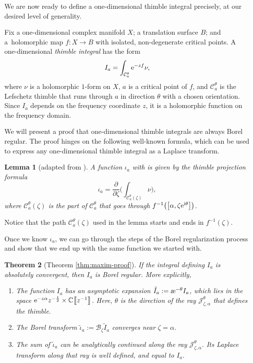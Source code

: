 \documentclass[10pt,a4paper]{amsart}
\newcommand{\maps}{\colon}
\newcommand{\C}{\mathbb{C}}
\newcommand{\series}[1]{\tilde{#1}}
\newcommand{\laplace}{\mathcal{L}}
\newcommand{\borel}{\mathcal{B}}
\newcommand{\aexp}{\text{\rm \ae}}
\numberwithin{equation}{section}
\newtheorem{Theorem}{Theorem}[section]
\newtheorem{Lemma}[Theorem]{Lemma}
\begin{document}
We are now ready to define a one-dimensional thimble integral precisely, at our desired level of generality.
\begin{Definition}
Fix a one-dimensional complex manifold $X$; a translation surface $B$; and a~holomorphic map $f \maps X \to B$ with isolated, non-degenerate critical points. A one-dimensional {\em thimble integral} has the form
\[
 I_a = \int_{\mathcal{C}_a^\theta} {\rm e}^{-zf} \nu,
 \]
where $\nu$ is a holomorphic $1$-form on $X$, $a$ is a critical point of $f$, and $\mathcal{C}^\theta_a$ is the Lefschetz thimble that runs through $a$ in direction $\theta$ with a chosen orientation. Since $I_a$ depends on the frequency coordinate $z$, it is a holomorphic function on the frequency domain.
\end{Definition}
We will present a proof that one-dimensional thimble integrals are always Borel regular. The proof hinges on the following well-known formula, which can be used to express any one-dimensional thimble integral as a Laplace transform.
\begin{Lemma}[adapted from {\cite[Section~3.3]{pham}}]\label{lem:thimble_proj_formula}
A function $\iota_a$ with \smash{$I_a = \laplace_{\zeta, \alpha}^\theta \iota_a$} is given by the {\em thimble projection formula}
\[
 \iota_a = \frac{\partial}{\partial \zeta} \biggl( \int_{\mathcal{C}_a^\theta(\zeta)}\nu \biggr),
 \]
where $\mathcal{C}_a^\theta(\zeta)$ is the part of $\mathcal{C}_a^\theta$ that goes through $f^{-1}\bigl(\bigl[\alpha,\zeta {\rm e}^{{\rm i}\theta}\bigr]\bigr)$.
\end{Lemma}
Notice that the path $\mathcal{C}_a^\theta(\zeta)$ used in the lemma starts and ends in $f^{-1}(\zeta)$.

Once we know $\iota_a$, we can go through the steps of the Borel regularization process and show that we end up with the same function we started with.

\begin{Theorem}[Theorem \ref{thm:maxim-proof}]\label{thm:maxim}
If the integral defining $I_a$ is absolutely convergent, then $I_a$ is Borel regular. More explicitly,
\begin{enumerate}\itemsep=0pt
\item[$(1)$] %
The function $I_a$ has an asymptotic expansion $\series{I}_a := \aexp^{-\theta} I_a$, which lies in the space ${\rm e}^{-z \alpha} \smash{ z^{-\frac{1}{2}}} \allowbreak\times \C\big\llbracket z^{-1}\big\rrbracket$. Here, $\theta$ is the direction of the ray $\mathcal{J}^\theta_{\zeta, \alpha}$ that defines the thimble.
\item[$(2)$] %
The Borel transform $\series{\iota}_a := \borel_\zeta \series{I}_a$ converges near $\zeta = \alpha$.
\item[$(3)$] %
The sum of $\series{\iota}_a$ can be analytically continued along the ray $\mathcal{J}_{\zeta, \alpha}^\theta$. Its Laplace transform along that ray is well defined, and equal to $I_a$.
\end{enumerate}
\end{Theorem}
\end{document}
